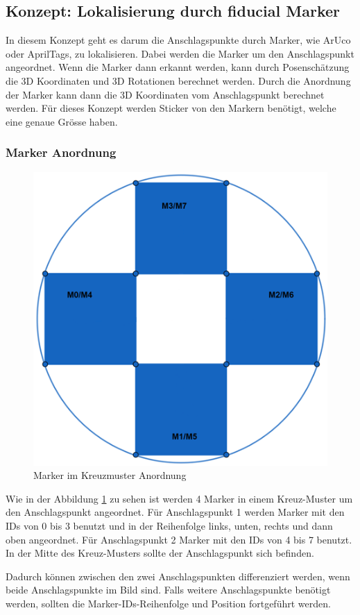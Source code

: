 \subsection{Konzept: Lokalisierung durch fiducial Marker}

In diesem Konzept geht es darum die Anschlagspunkte durch Marker, wie ArUco oder AprilTags, zu lokalisieren. Dabei werden die Marker um den Anschlagspunkt angeordnet. Wenn die Marker dann erkannt werden, kann durch Posenschätzung die 3D Koordinaten und 3D Rotationen berechnet werden. Durch die Anordnung der Marker kann dann die 3D Koordinaten vom Anschlagspunkt berechnet werden. 
Für dieses Konzept werden Sticker von den Markern benötigt, welche eine genaue Grösse haben. 

\subsubsection{Marker Anordnung}
\label{sec:anordnung}

\begin{figure}[H]
    \centering
    \includegraphics[width=0.5\linewidth]{graphics/anordnung_marker.png}
    \caption{Marker im Kreuzmuster Anordnung}
    \label{fig:markerAnordnung}
\end{figure}

Wie in der Abbildung \ref{fig:markerAnordnung} zu sehen ist werden 4 Marker in einem Kreuz-Muster um den Anschlagspunkt angeordnet. 
Für Anschlagspunkt 1 werden Marker mit den IDs von 0 bis 3 benutzt und in der Reihenfolge links, unten, rechts und dann oben angeordnet. 
Für Anschlagspunkt 2 Marker mit den IDs von 4 bis 7 benutzt. 
In der Mitte des Kreuz-Musters sollte der Anschlagspunkt sich befinden. 

Dadurch können zwischen den zwei Anschlagspunkten differenziert werden, wenn beide Anschlagspunkte im Bild sind. 
Falls weitere Anschlagspunkte benötigt werden, sollten die Marker-IDs-Reihenfolge und Position fortgeführt werden. 

